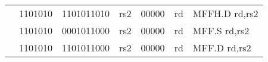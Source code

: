 \begin{table}[p]
\begin{small}
\begin{center}
\begin{tabular}{rcccccccccl}
&
\multicolumn{1}{|c|}{1101010} &
\multicolumn{5}{c|}{1101011010} &
\multicolumn{1}{c|}{rs2} &
\multicolumn{1}{c|}{00000} &
\multicolumn{1}{c|}{rd} & MFFH.D rd,rs2 \\
\cline{2-10}
  

&
\multicolumn{1}{|c|}{1101010} &
\multicolumn{5}{c|}{0001011000} &
\multicolumn{1}{c|}{rs2} &
\multicolumn{1}{c|}{00000} &
\multicolumn{1}{c|}{rd} & MFF.S rd,rs2 \\
\cline{2-10}
  

&
\multicolumn{1}{|c|}{1101010} &
\multicolumn{5}{c|}{1101011000} &
\multicolumn{1}{c|}{rs2} &
\multicolumn{1}{c|}{00000} &
\multicolumn{1}{c|}{rd} & MFF.D rd,rs2 \\
\cline{2-10}
  

\end{tabular}
\end{center}
\end{small}

\label{instr-table}
\end{table}
  

\newpage


